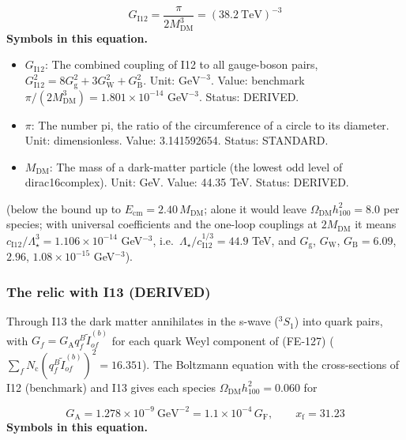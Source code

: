\documentclass[
  10pt,
]{article}
\providecommand{\tightlist}{%
  \setlength{\itemsep}{0pt}\setlength{\parskip}{0pt}}
\begin{document}
\[ G_{\mathrm{I12}} = \frac{\pi}{2M_{\mathrm{DM}}^3} = (38.2\ \text{TeV})^{-3} \]
\textbf{Symbols in this equation.}

\begin{itemize}
\tightlist
\item
  \(G_{\mathrm{I12}}\): The combined coupling of I12 to all gauge-boson
  pairs,
  \(G_{\mathrm{I12}}^2 = 8G_{\mathrm{g}}^2 + 3G_{\mathrm{W}}^2 + G_{\mathrm{B}}^2\).
  Unit: \(\mathrm{GeV}^{-3}\). Value: benchmark
  \(\pi/(2M_{\mathrm{DM}}^3) = 1.801\times10^{-14}\) GeV\(^{-3}\).
  Status: DERIVED.
\item
  \(\pi\): The number pi, the ratio of the circumference of a circle to
  its diameter. Unit: dimensionless. Value: 3.141592654. Status:
  STANDARD.
\item
  \(M_{\mathrm{DM}}\): The mass of a dark-matter particle (the lowest
  odd level of dirac16complex). Unit: GeV. Value: 44.35 TeV. Status:
  DERIVED.
\end{itemize}

(below the bound up to \(E_{\mathrm{cm}} = 2.40\,M_{\mathrm{DM}}\);
alone it would leave \(\Omega_{\mathrm{DM}}h_{100}^2 = 8.0\) per
species; with universal coefficients and the one-loop couplings at
\(2M_{\mathrm{DM}}\) it means
\(c_{\mathrm{I12}}/\Lambda_\star^3 = 1.106\times10^{-14}\) GeV\(^{-3}\),
i.e.~\(\Lambda_\star/c_{\mathrm{I12}}^{1/3} = 44.9\) TeV, and
\(G_{\mathrm{g}}\), \(G_{\mathrm{W}}\), \(G_{\mathrm{B}} = 6.09\),
\(2.96\), \(1.08\times10^{-15}\) GeV\(^{-3}\)).

\hypertarget{the-relic-with-i13-derived}{%
\subsubsection*{The relic with I13
(DERIVED)}\label{the-relic-with-i13-derived}}

Through I13 the dark matter annihilates in the s-wave (\(^3S_1\)) into
quark pairs, with \(G_f = G_{\mathrm{A}}q^B_f\tilde I^{(b)}_{of}\) for
each quark Weyl component of (FE-127)
(\(\sum_fN_{\mathrm{c}}(q^B_f\tilde I^{(b)}_{of})^2 = 16.351\)). The
Boltzmann equation with the cross-sections of I12 (benchmark) and I13
gives each species \(\Omega_{\mathrm{DM}}h_{100}^2 = 0.060\) for

\[ G_{\mathrm{A}} = 1.278\times10^{-9}\ \text{GeV}^{-2} = 1.1\times10^{-4}\,G_{\mathrm{F}},\qquad x_{\mathrm{f}} = 31.23 \]
\textbf{Symbols in this equation.}
\end{document}
